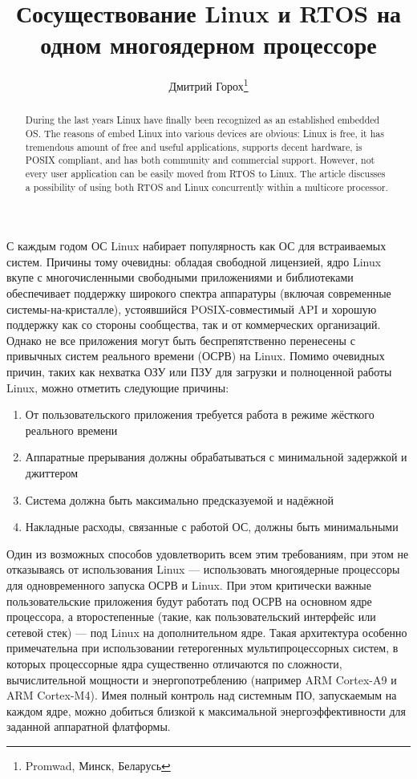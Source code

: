 \documentclass[10pt, a5paper]{article}
\begin{document}
\title{Сосуществование Linux и RTOS на одном многоядерном процессоре}%

\author{Дмитрий Горох\footnote{Promwad, Минск, Беларусь}}
\maketitle

\begin{abstract}
During the last years Linux have finally been recognized as an established embedded OS. The reasons of embed Linux into various devices are obvious: Linux is free, it has tremendous amount of free and useful applications, supports decent hardware, is POSIX compliant, and has both community and commercial support. However, not every user application can be easily moved from RTOS to Linux. The article discusses a possibility of using both RTOS and Linux concurrently within a multicore processor.
\end{abstract}


С каждым годом ОС Linux набирает популярность как ОС для встраиваемых систем. Причины тому очевидны: обладая свободной лицензией, ядро Linux вкупе с многочисленными свободными приложениями и библиотеками обеспечивает поддержку широкого спектра аппаратуры (включая современные системы-на-кристалле), устоявшийся POSIX-совместимый API и хорошую поддержку как со стороны сообщества, так и от коммерческих организаций. Однако не все приложения могут быть беспрепятственно перенесены с привычных систем реального времени (ОСРВ) на Linux. Помимо очевидных причин, таких как нехватка ОЗУ или ПЗУ для загрузки и полноценной работы Linux, можно отметить следующие причины:

\begin{enumerate}
  \item От пользовательского приложения требуется работа в режиме жёсткого реального времени
  \item Аппаратные прерывания должны обрабатываться с минимальной задержкой и джиттером
  \item Система должна быть максимально предсказуемой и надёжной
  \item Накладные расходы, связанные с работой ОС, должны быть минимальными
\end{enumerate}

Один из возможных способов удовлетворить всем этим требованиям, при этом не отказываясь от использования Linux --- использовать многоядерные процессоры для одновременного запуска ОСРВ и Linux. При этом критически важные пользовательские приложения будут работать под ОСРВ на основном ядре процессора, а второстепенные (такие, как пользовательский интерфейс или сетевой стек) --- под Linux на дополнительном ядре. Такая архитектура особенно примечательна при использовании гетерогенных мультипроцессорных систем, в которых процессорные ядра существенно отличаются по сложности, вычислительной мощности и энергопотреблению (например ARM Cortex-A9 и ARM Cortex-M4). Имея полный контроль над системным ПО, запускаемым на каждом ядре, можно добиться близкой к максимальной энергоэффективности для заданной аппаратной флатформы.
\end{document}
